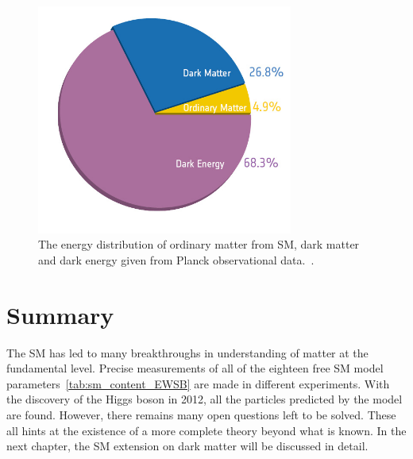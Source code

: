     \begin{figure}[!htb]
        \begin{center}
            \includegraphics[width=0.75\textwidth]{figures/chapter_SM/Planck}
            \caption{
                The energy distribution of ordinary matter from SM, dark matter and dark energy given from Planck observational data.~\cite{ade2016planck}.
            }
            \label{fig:planck}
        \end{center}
    \end{figure}

\section{Summary}
The SM has led to many breakthroughs in understanding of matter at the fundamental level. Precise measurements of all of the eighteen free SM model parameters~\ref{tab:sm_content_EWSB} are made in different experiments. With the discovery of the Higgs boson in 2012, all the particles predicted by the model are found. However, there remains many open questions left to be solved. These all hints at the existence of a more complete theory beyond what is known. In the next chapter, the SM extension on dark matter will be discussed in detail. 




